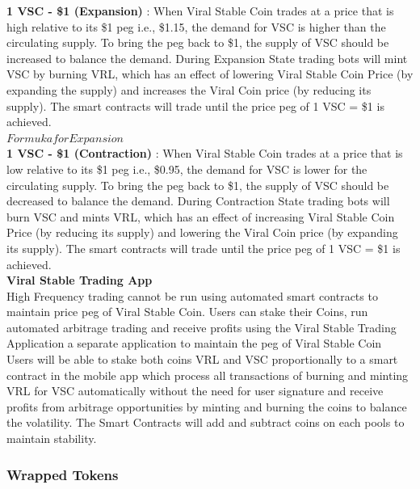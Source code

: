 \documentclass[10pt]{article}
\begin{document}
\textbf{1 VSC - \$1 (Expansion)} : When Viral Stable Coin trades at a price that is high relative to it\textsc{}s \$1 peg i.e., \$1.15, the demand for VSC is higher than the circulating supply. To bring the peg back to \$1, the supply of VSC should be increased to balance the demand. During Expansion State trading bots will mint VSC by burning VRL, which has an effect of lowering Viral Stable Coin Price (by expanding the supply) and increases the Viral Coin price (by reducing it\textsc{}s supply). The smart contracts will trade until the price peg of 1 VSC = \$1 is achieved.\\

$Formuka for Expansion$\\

\textbf{1 VSC - \$1 (Contraction)} : When Viral Stable Coin trades at a price that is low relative to it\textsc{}s \$1 peg i.e., \$0.95, the demand for VSC is lower for the circulating supply. To bring the peg back to \$1, the supply of VSC should be decreased to balance the demand. During Contraction State trading bots will burn VSC and mints VRL, which has an effect of increasing Viral Stable Coin Price (by reducing it\textsc{}s supply) and lowering the Viral Coin price (by expanding it\textsc{}s supply). The smart contracts will trade until the price peg of 1 VSC = \$1 is achieved.\\

\textbf{Viral Stable Trading App}\\

High Frequency trading cannot be run using automated smart contracts to maintain price peg of Viral Stable Coin. Users can stake their Coins, run automated arbitrage trading and receive profits using the Viral Stable Trading Application a separate application to maintain the peg of Viral Stable Coin\\

Users will be able to stake both coins VRL and VSC proportionally to a smart contract in the mobile app which process all transactions of burning and minting VRL for VSC automatically without the need for user signature and receive profits from arbitrage opportunities by minting and burning the coins to balance the volatility. The Smart Contracts will add and subtract coins on each pools to maintain stability.\\

\subsubsection{Wrapped Tokens}
\end{document}
